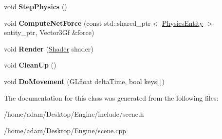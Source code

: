 \begin{DoxyCompactItemize}
void {\bfseries Step\+Physics} ()
\item 
\mbox{\label{classScene_a603827ae26832207c3d8ff01d4f80f3f}} 
void {\bfseries Compute\+Net\+Force} (const std\+::shared\+\_\+ptr$<$ \hyperlink{classPhysicsEntity}{Physics\+Entity} $>$ entity\+\_\+ptr, Vector3\+Gf \&force)
\item 
\mbox{\label{classScene_a7edc9fabe7ef61a426cd6278a0b209fe}} 
void {\bfseries Render} (\hyperlink{classShader}{Shader} shader)
\item 
\mbox{\label{classScene_a830078c354d5df8ef9b811dac7b2c7dd}} 
void {\bfseries Clean\+Up} ()
\item 
\mbox{\label{classScene_ad4760f2a7033d15e0771a82a8296a8e7}} 
void {\bfseries Do\+Movement} (G\+Lfloat delta\+Time, bool keys\mbox{[}$\,$\mbox{]})
\end{DoxyCompactItemize}


The documentation for this class was generated from the following files\+:\begin{DoxyCompactItemize}
\item 
/home/adam/\+Desktop/\+Engine/include/scene.\+h\item 
/home/adam/\+Desktop/\+Engine/scene.\+cpp\end{DoxyCompactItemize}
